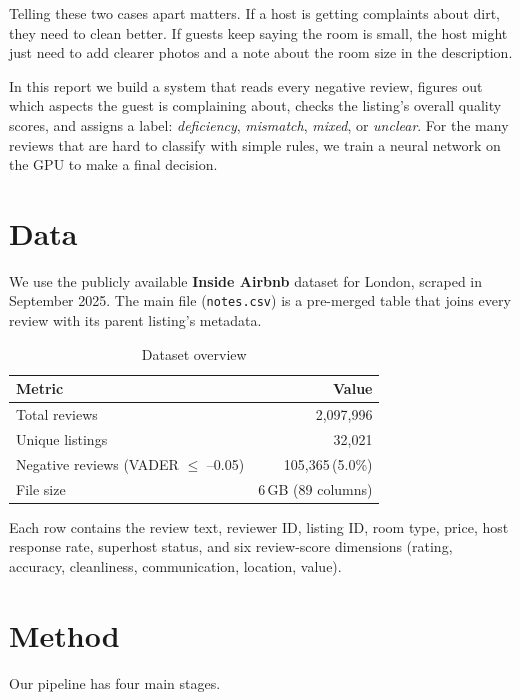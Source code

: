 \documentclass[12pt,a4paper]{article}
\begin{document}
Telling these two cases apart matters.
If a host is getting complaints about dirt, they need to clean better.
If guests keep saying the room is small, the host might just need to add clearer photos and a note about the room size in the description.

In this report we build a system that reads every negative review, figures out which aspects the guest is complaining about, checks the listing's overall quality scores, and assigns a label: \emph{deficiency}, \emph{mismatch}, \emph{mixed}, or \emph{unclear}.
For the many reviews that are hard to classify with simple rules, we train a neural network on the GPU to make a final decision.

\section{Data}

We use the publicly available \textbf{Inside Airbnb} dataset for London, scraped in September 2025.
The main file (\texttt{notes.csv}) is a pre-merged table that joins every review with its parent listing's metadata.

\begin{table}[H]
\centering
\caption{Dataset overview}
\begin{tabular}{lr}
\toprule
\textbf{Metric} & \textbf{Value} \\
\midrule
Total reviews          & 2,097,996 \\
Unique listings        & 32,021 \\
Negative reviews (VADER $\leq$ --0.05) & 105,365\,(5.0\%) \\
File size              & 6\,GB (89 columns) \\
\bottomrule
\end{tabular}
\end{table}

Each row contains the review text, reviewer ID, listing ID, room type, price, host response rate, superhost status, and six review-score dimensions (rating, accuracy, cleanliness, communication, location, value).

\section{Method}

Our pipeline has four main stages.
\end{document}
